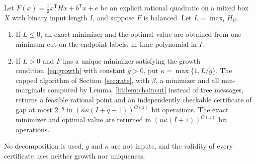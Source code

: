 \begin{theorem}\label{lit:thm:balanced}
Let $F(x)=\tfrac12x^{\mathsf T}Hx+b^{\mathsf T}x+e$ be an explicit rational quadratic on a
mixed box $X$ with binary input length $I$, and suppose $F$ is balanced. Let
$L=\max_iH_{ii}$.
\begin{enumerate}
\item If $L\le0$, an exact minimizer and the optimal value are obtained from one minimum cut on
the endpoint labels, in time polynomial in $I$.
\item If $L>0$ and $F$ has a unique minimizer satisfying the growth condition~\eqref{eq:growth}
with constant $g>0$, put $\kappa=\max\{1,L/g\}$. The capped algorithm of
Section~\ref{sec:rate}, with $\beta$, a minimizer and all min-marginals computed by
Lemma~\ref{lit:lem:chaincut} instead of tree messages, returns a feasible rational point and an
independently checkable certificate of gap at most $2^{-q}$ in
$(n\kappa(I+q+1))^{O(1)}$ bit operations. The exact minimizer and optimal value are returned in
$(n\kappa(I+1))^{O(1)}$ bit operations.
\end{enumerate}
No decomposition is used, $g$ and $\kappa$ are not inputs, and the validity of every certificate
uses neither growth nor uniqueness.
\end{theorem}

